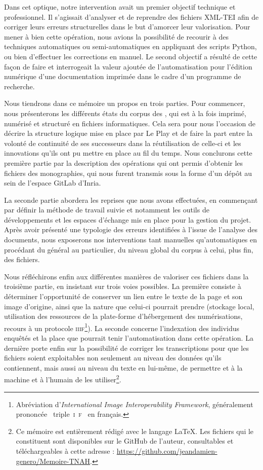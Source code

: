 Dans cet optique, notre intervention avait un premier objectif technique et professionnel. Il s'agissait d'analyser et de reprendre des fichiers XML-TEI afin de corriger leurs erreurs structurelles dans le but d'amorcer leur valorisation. Pour mener à bien cette opération, nous avions la possibilité de recourir à des techniques automatiques ou semi-automatiques en appliquant des scripts Python, ou bien d'effectuer les corrections en manuel. Le second objectif a résulté de cette façon de faire et interrogeait la valeur ajoutée de l'automatisation pour l'édition numérique d'une documentation imprimée dans le cadre d'un programme de recherche.

Nous tiendrons dans ce mémoire un propos en trois parties. Pour commencer, nous présenterons les différents états du corpus des \odm{}, qui est à la fois imprimé, numérisé et structuré en fichiers informatiques. Cela sera pour nous l'occasion de décrire la structure logique mise en place par Le Play et de faire la part entre la volonté de continuité de ses successeurs dans la réutilisation de celle-ci et les innovations qu'ils ont pu mettre en place au fil du temps. Nous conclurons cette première partie par la description des opérations qui ont permis d'obtenir les fichiers des monographies, qui nous furent transmis sous la forme d'un dépôt au sein de l'espace GitLab d'Inria.

La seconde partie abordera les reprises que nous avons effectuées, en commençant par définir la méthode de travail suivie et notamment les outils de développements et les espaces d'échange  mis en place pour la gestion du projet. Après avoir présenté une typologie des erreurs identifiées à l'issue de l'analyse des documents, nous exposerons nos interventions tant manuelles qu'automatiques en procédant du général au particulier, \cad{} du niveau global du corpus à celui, plus fin, des fichiers.

Nous réfléchirons enfin aux différentes manières de valoriser ces fichiers dans la troisième partie, en insistant sur trois voies possibles. La première consiste à déterminer l'opportunité de conserver un lien entre le texte de la page et son image d'origine, ainsi que la nature que celui-ci pourrait prendre (stockage local, utilisation des ressources de la plate-forme d'hébergement des numérisations, recours à un protocole \textsc{iiif}\footnote{Abréviation d'\textit{International Image Interoperability Framework}, généralement prononcée \og~triple~\textsc{i}~\textsc{f}~\fg{} en français.}). La seconde concerne l'indexation des individus enquêtés et la place que pourrait tenir l'automatisation dans cette opération. La dernière porte enfin sur la possibilité de corriger les transcriptions pour que les fichiers soient exploitables non seulement au niveau des données qu'ils contiennent, mais aussi au niveau du texte en lui-même, \cad{} de permettre et à la machine et à l'humain de les utiliser\footnote{Ce mémoire est entièrement rédigé avec le langage \LaTeX. Les fichiers qui le constituent sont disponibles sur le GitHub de l'auteur, consultables et téléchargeables à cette adresse : \url{https://github.com/jeandamien-genero/Memoire-TNAH}.}.

